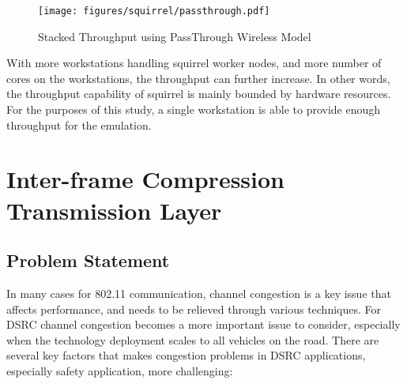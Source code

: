 \documentclass[12pt]{report}
\begin{document}
\begin{figure}[h]
  \texttt{[image: figures/squirrel/passthrough.pdf]}
  \caption{\label{fig:passthrough}Stacked Throughput using PassThrough Wireless Model}
\end{figure}

With more workstations handling squirrel worker nodes, and more number of cores on the workstations, the throughput can further increase. In other words, the throughput capability of squirrel is mainly bounded by hardware resources. For the purposes of this study, a single workstation is able to provide enough throughput for the emulation.

\chapter{Inter-frame Compression Transmission Layer}

\section{Problem Statement}
\label{sec:problem_congestion}

In many cases for 802.11 communication, channel congestion is a key issue that affects performance, and needs to be relieved through various techniques. For DSRC channel congestion becomes a more important issue to consider, especially when the technology deployment scales to all vehicles on the road. There are several key factors that makes congestion problems in DSRC applications, especially safety application, more challenging:
\end{document}

